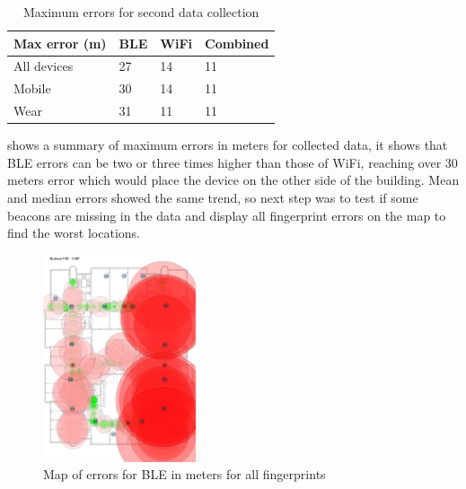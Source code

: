 \vspace*{6pt}
\begin{table}[h]
	\begin{center}
		\begin{tabular}{ l C{2cm} C{2cm} C{2cm} }
			\hline
			Max error (m) & BLE & WiFi & Combined \\ 
			\hline
			All devices & 27 & 14 & 11 \\ 
			Mobile & 30 & 14 & 11 \\ 
			Wear & 31 & 11 & 11 \\ 
			\hline
		\end{tabular}
		\caption{Maximum errors for second data collection}
		\label{tab01c06}
	\end{center}
\end{table} 
\vspace*{-\baselineskip}
\vspace*{6pt}

 shows a summary of maximum errors in meters for collected data, it shows that BLE errors can be two or three times higher than those of WiFi, reaching over 30 meters error which would place the device on the other side of the building. Mean and median errors showed the same trend, so next step was to test if some beacons are missing in the data and display all fingerprint errors on the map to find the worst locations.

\begin{figure}[H]
	\begin{centering}
		\includegraphics[width=0.4\textwidth]{img/second_data_collection_errors}
		\par\end{centering}
	\caption{Map of errors for BLE in meters for all fingerprints}
	\label{fig02c06}
\end{figure}

